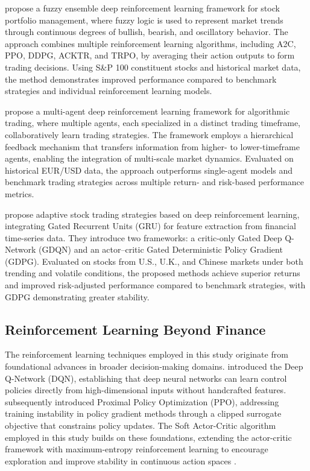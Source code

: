 \documentclass[]{elsarticle}
\begin{document}
\citet{jrfm16030201} propose a fuzzy ensemble deep reinforcement learning framework for stock portfolio management, where fuzzy logic is used to represent market trends through continuous degrees of bullish, bearish, and oscillatory behavior. The approach combines multiple reinforcement learning algorithms, including A2C, PPO, DDPG, ACKTR, and TRPO, by averaging their action outputs to form trading decisions. Using S\&P 100 constituent stocks and historical market data, the method demonstrates improved performance compared to benchmark strategies and individual reinforcement learning models.

\citet{shavandi2022multi} propose a multi-agent deep reinforcement learning framework for algorithmic trading, where multiple agents, each specialized in a distinct trading timeframe, collaboratively learn trading strategies. The framework employs a hierarchical feedback mechanism that transfers information from higher- to lower-timeframe agents, enabling the integration of multi-scale market dynamics. Evaluated on historical EUR/USD data, the approach outperforms single-agent models and benchmark trading strategies across multiple return- and risk-based performance metrics.

\citet{wu2020adaptive} propose adaptive stock trading strategies based on deep reinforcement learning, integrating Gated Recurrent Units (GRU) for feature extraction from financial time-series data. They introduce two frameworks: a critic-only Gated Deep Q-Network (GDQN) and an actor–critic Gated Deterministic Policy Gradient (GDPG). Evaluated on stocks from U.S., U.K., and Chinese markets under both trending and volatile conditions, the proposed methods achieve superior returns and improved risk-adjusted performance compared to benchmark strategies, with GDPG demonstrating greater stability.

\hypertarget{non-trading-reinforcement-learning}{%
\subsection{Reinforcement Learning Beyond Finance}\label{non-trading-reinforcement-learning}}

The reinforcement learning techniques employed in this study originate from foundational advances in broader decision-making domains. \citet{mnih2015human} introduced the Deep Q-Network (DQN), establishing that deep neural networks can learn control policies directly from high-dimensional inputs without handcrafted features. \citet{schulman2017proximal} subsequently introduced Proximal Policy Optimization (PPO), addressing training instability in policy gradient methods through a clipped surrogate objective that constrains policy updates. The Soft Actor-Critic algorithm employed in this study builds on these foundations, extending the actor-critic framework with maximum-entropy reinforcement learning to encourage exploration and improve stability in continuous action spaces \citep{Haarnoja2018}.
\end{document}
